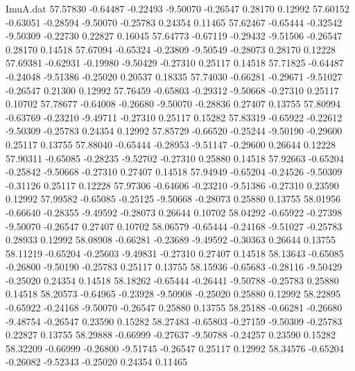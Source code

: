 \begin{filecontents}{ImuA.dat}
  57.57830   -0.64487   -0.22493   -9.50070   -0.26547    0.28170    0.12992
  57.60152   -0.63051   -0.28594   -9.50070   -0.25783    0.24354    0.11465
  57.62467   -0.65444   -0.32542   -9.50309   -0.22730    0.22827    0.16045
  57.64773   -0.67119   -0.29432   -9.51506   -0.26547    0.28170    0.14518
  57.67094   -0.65324   -0.23809   -9.50549   -0.28073    0.28170    0.12228
  57.69381   -0.62931   -0.19980   -9.50429   -0.27310    0.25117    0.14518
  57.71825   -0.64487   -0.24048   -9.51386   -0.25020    0.20537    0.18335
  57.74030   -0.66281   -0.29671   -9.51027   -0.26547    0.21300    0.12992
  57.76459   -0.65803   -0.29312   -9.50668   -0.27310    0.25117    0.10702
  57.78677   -0.64008   -0.26680   -9.50070   -0.28836    0.27407    0.13755
  57.80994   -0.63769   -0.23210   -9.49711   -0.27310    0.25117    0.15282
  57.83319   -0.65922   -0.22612   -9.50309   -0.25783    0.24354    0.12992
  57.85729   -0.66520   -0.25244   -9.50190   -0.29600    0.25117    0.13755
  57.88040   -0.65444   -0.28953   -9.51147   -0.29600    0.26644    0.12228
  57.90311   -0.65085   -0.28235   -9.52702   -0.27310    0.25880    0.14518
  57.92663   -0.65204   -0.25842   -9.50668   -0.27310    0.27407    0.14518
  57.94949   -0.65204   -0.24526   -9.50309   -0.31126    0.25117    0.12228
  57.97306   -0.64606   -0.23210   -9.51386   -0.27310    0.23590    0.12992
  57.99582   -0.65085   -0.25125   -9.50668   -0.28073    0.25880    0.13755
  58.01956   -0.66640   -0.28355   -9.49592   -0.28073    0.26644    0.10702
  58.04292   -0.65922   -0.27398   -9.50070   -0.26547    0.27407    0.10702
  58.06579   -0.65444   -0.24168   -9.51027   -0.25783    0.28933    0.12992
  58.08908   -0.66281   -0.23689   -9.49592   -0.30363    0.26644    0.13755
  58.11219   -0.65204   -0.25603   -9.49831   -0.27310    0.27407    0.14518
  58.13643   -0.65085   -0.26800   -9.50190   -0.25783    0.25117    0.13755
  58.15936   -0.65683   -0.28116   -9.50429   -0.25020    0.24354    0.14518
  58.18262   -0.65444   -0.26441   -9.50788   -0.25783    0.25880    0.14518
  58.20573   -0.64965   -0.23928   -9.50908   -0.25020    0.25880    0.12992
  58.22895   -0.65922   -0.24168   -9.50070   -0.26547    0.25880    0.13755
  58.25188   -0.66281   -0.26680   -9.48754   -0.26547    0.23590    0.15282
  58.27483   -0.65803   -0.27159   -9.50309   -0.25783    0.22827    0.13755
  58.29888   -0.66999   -0.27637   -9.50788   -0.24257    0.23590    0.15282
  58.32209   -0.66999   -0.26800   -9.51745   -0.26547    0.25117    0.12992
  58.34576   -0.65204   -0.26082   -9.52343   -0.25020    0.24354    0.11465

\end{filecontents}

